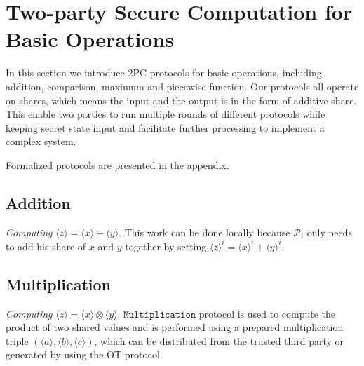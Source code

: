 \documentclass[letterpaper]{article} %
\begin{document}
    
    
    \section{Two-party Secure Computation for Basic Operations}
    
    In this section we introduce 2PC protocols for basic operations, 
    including addition, comparison, maximum and piecewise function.
    Our protocols all operate on shares, which means
    the input and the output is in the form of additive share.
    This enable two parties to run multiple rounds of different
    protocols while keeping secret state input 
    and facilitate further processing to implement a complex system.

    Formalized protocols are presented in the appendix.

    \subsection{Addition}
    
    \emph{Computing} $ \langle z\rangle  = \langle x\rangle  + \langle y\rangle $. This work can be done locally because 
    $\mathcal{P}_{i}$ only needs to add his share of $x$ and $y$ together by setting $\langle z\rangle^{i}  = \langle x\rangle^{i}  + \langle y\rangle^{i} $.
    
    
    
    \subsection{Multiplication}
    \emph{Computing} $ \langle z\rangle  = \langle x\rangle  \otimes \langle y\rangle $.
    $\mathtt{Multiplication}$ protocol is used to compute the product of two shared values and is performed 
    using a prepared multiplication triple $(\langle a\rangle,\langle b\rangle,\langle c\rangle)$, 
    which can be distributed from the trusted third party or 
    generated by using the OT protocol.
       
\end{document}
